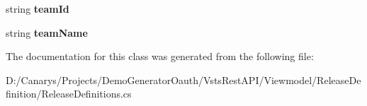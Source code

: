 \begin{DoxyCompactItemize}
string {\bfseries team\+Id}
\item 
\mbox{\label{class_vsts_rest_a_p_i_1_1_viewmodel_1_1_release_definition_1_1_release_definitions_1_1_inputs_a81ed22338ef711d245b4df9033802ae8}} 
string {\bfseries team\+Name}
\end{DoxyCompactItemize}


The documentation for this class was generated from the following file\+:\begin{DoxyCompactItemize}
\item 
D\+:/\+Canarys/\+Projects/\+Demo\+Generator\+Oauth/\+Vsts\+Rest\+A\+P\+I/\+Viewmodel/\+Release\+Definition/Release\+Definitions.\+cs\end{DoxyCompactItemize}
